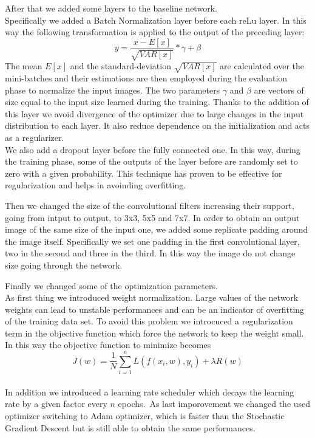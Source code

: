 \documentclass[12pt, a4paper]{report}
\begin{document}
After that we added some layers to the baseline network.\\
Specifically we added a Batch Normalization layer before each reLu layer. In this way the following transformation is applied to the output of the preceding layer:
$$ y = \frac{x - E[x]}{\sqrt{VAR[x]}} * \gamma + \beta$$
The mean $E[x]$ and the standard-deviation $\sqrt{VAR[x]}$ are calculated over the mini-batches and their estimations are then employed during the evaluation phase to normalize the input images. The two parameters $\gamma$ and $\beta$ are vectors of size equal to the input size learned during the training. Thanks to the addition of this layer we avoid divergence of the optimizer due to large changes in the input distribution to each layer. It also reduce dependence on the initialization and acts as a regularizer.\\
We also add a dropout layer before the fully connected one. In this way, during the training phase, some of the outputs of the layer before are randomly set to zero with a given probability. This technique has proven to be effective for regularization and helps in avoinding overfitting.

Then we changed the size of the convolutional filters increasing their support, going from intput to output, to 3x3, 5x5 and 7x7. In order to obtain an output image of the same size of the input one, we added some replicate padding around the image itself. Specifically we set one padding in the first convolutional layer, two in the second and three in the third. In this way the image do not change size going through the network.

Finally we changed some of the optimization parameters.\\
As first thing we introduced weight normalization. Large values of the network weights can lead to unstable performances and can be an indicator of overfitting of the training data set. To avoid this problem we introcuced a regularization term in the objective function which force the network to keep the weight small. In this way the objective function to minimize becomes
$$J(w) = \frac 1 N \sum_{i=1}^n L(f(x_i, w), y_i) + \lambda R(w)$$\\
In addition we introduced a learning rate scheduler which decays the learning rate by a given factor every $n$ epochs.\
As last imporovement we changed the used optimizer switching to Adam optimizer, which is faster than the Stochastic Gradient Descent but is still able to obtain the same performances.
\end{document}
